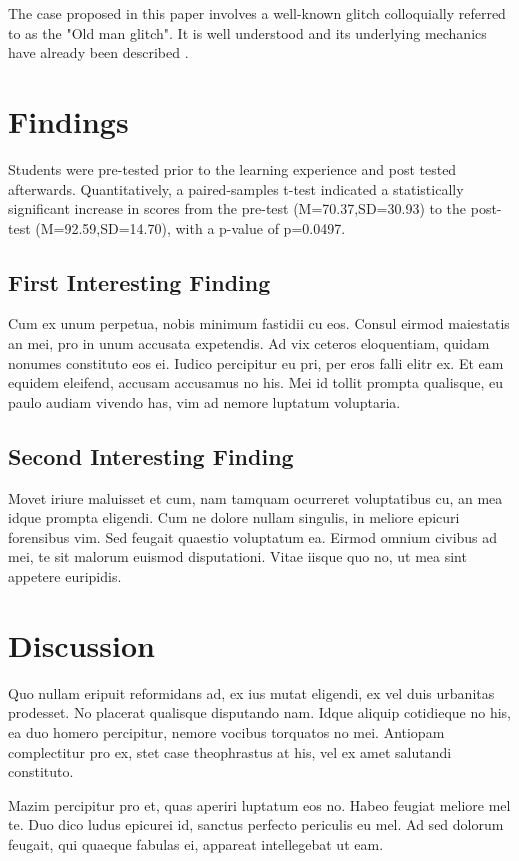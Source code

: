 \documentclass[letterpaper]{article}
\begin{document}
The case proposed in this paper involves a well-known glitch colloquially referred to as the "Old man glitch". It is well understood and its underlying mechanics have already been described \cite{bulbapedia2005} \cite{scrumpy2016missing}.

\section{Findings}
Students were pre-tested prior to the learning experience and post tested afterwards. Quantitatively, a paired-samples t-test indicated a statistically significant increase in scores from the pre-test (M=70.37,SD=30.93) to the post-test (M=92.59,SD=14.70), with a p-value of p=0.0497.

\subsection{First Interesting Finding}
Cum ex unum perpetua, nobis minimum fastidii cu eos. Consul eirmod maiestatis an mei, pro in unum accusata expetendis. Ad vix ceteros eloquentiam, quidam nonumes constituto eos ei. Iudico percipitur eu pri, per eros falli elitr ex. Et eam equidem eleifend, accusam accusamus no his. Mei id tollit prompta qualisque, eu paulo audiam vivendo has, vim ad nemore luptatum voluptaria.

\subsection{Second Interesting Finding}
Movet iriure maluisset et cum, nam tamquam ocurreret voluptatibus cu, an mea idque prompta eligendi. Cum ne dolore nullam singulis, in meliore epicuri forensibus vim. Sed feugait quaestio voluptatum ea. Eirmod omnium civibus ad mei, te sit malorum euismod disputationi. Vitae iisque quo no, ut mea sint appetere euripidis.

\section{Discussion}
Quo nullam eripuit reformidans ad, ex ius mutat eligendi, ex vel duis urbanitas prodesset. No placerat qualisque disputando nam. Idque aliquip cotidieque no his, ea duo homero percipitur, nemore vocibus torquatos no mei. Antiopam complectitur pro ex, stet case theophrastus at his, vel ex amet salutandi constituto.

Mazim percipitur pro et, quas aperiri luptatum eos no. Habeo feugiat meliore mel te. Duo dico ludus epicurei id, sanctus perfecto periculis eu mel. Ad sed dolorum feugait, qui quaeque fabulas ei, appareat intellegebat ut eam.
\end{document}
